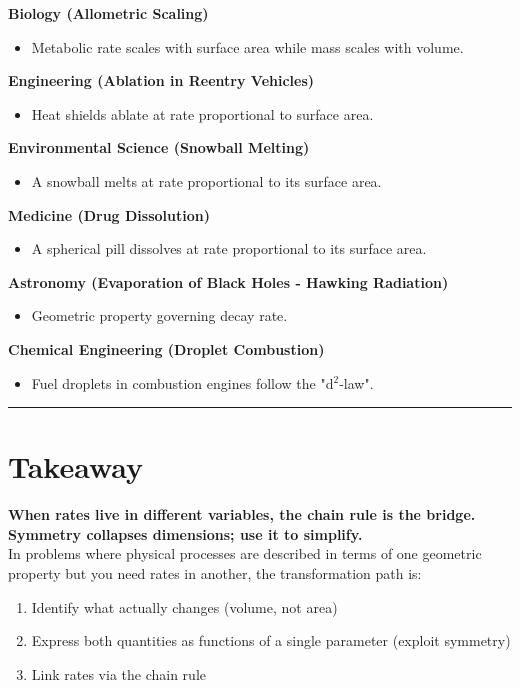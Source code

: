 \documentclass{article}
\begin{document}
\noindent \textbf{Biology (Allometric Scaling)}
\begin{itemize}
    \item Metabolic rate scales with surface area while mass scales with volume.
\end{itemize}

\noindent \textbf{Engineering (Ablation in Reentry Vehicles)}
\begin{itemize}
    \item Heat shields ablate at rate proportional to surface area.
\end{itemize}

\noindent \textbf{Environmental Science (Snowball Melting)}
\begin{itemize}
    \item A snowball melts at rate proportional to its surface area.
\end{itemize}

\noindent \textbf{Medicine (Drug Dissolution)}
\begin{itemize}
    \item A spherical pill dissolves at rate proportional to its surface area.
\end{itemize}

\noindent \textbf{Astronomy (Evaporation of Black Holes - Hawking Radiation)}
\begin{itemize}
    \item Geometric property governing decay rate.
\end{itemize}

\noindent \textbf{Chemical Engineering (Droplet Combustion)}
\begin{itemize}
    \item Fuel droplets in combustion engines follow the "d$^2$-law".
\end{itemize}

\noindent \rule{\textwidth}{0.4pt}

\section*{Takeaway}

\textbf{When rates live in different variables, the chain rule is the bridge. Symmetry collapses dimensions; use it to simplify.} \\

\noindent In problems where physical processes are described in terms of one geometric property but you need rates in another, the transformation path is:
\begin{enumerate}
    \item Identify what actually changes (volume, not area)
    \item Express both quantities as functions of a single parameter (exploit symmetry)
    \item Link rates via the chain rule
\end{enumerate}
\end{document}
